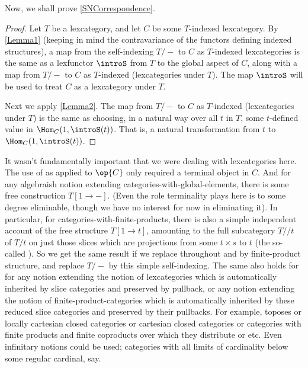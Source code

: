 Now, we shall prove \cref{SNCorrespondence}.

\begin{proof}
Let $T$ be a lexcategory, and let $C$ be some $T$-indexed lexcategory. By \cref{Lemma1} (keeping in mind the contravariance of the functors defining indexed structures), a map from the self-indexing $T/-$ to $C$ as $T$-indexed lexcategories is the same as a lexfunctor $\introS$ from $T$ to the global aspect of $C$, along with a map from $T/-$ to $C$ as $T$-indexed (lexcategories under $T$). The map $\introS$ will be used to treat $C$ as a lexcategory under $T$.

Next we apply \cref{Lemma2}. The map from $T/-$ to $C$ as $T$-indexed (lexcategories under $T$) is the same as choosing, in a natural way over all $t$ in $T$, some $t$-defined value in $\Hom_C(1, \introS(t))$. That is, a natural transformation from $t$ to $\Hom_C(1, \introS(t))$.
\end{proof}

\begin{remark}\label{IntrospGeneralDoctrine}
It wasn't fundamentally important that we were dealing with lexcategories here. The use of  as applied to $\op{C}$ only required a terminal object in $C$. And for any algebraish notion extending categories-with-global-elements, there is some free construction $T[1 \to -]$. (Even the role terminality plays here is to some degree eliminable, though we have no interest for now in eliminating it). In particular, for categories-with-finite-products, there is also a simple independent account of the free structure $T[1 \to t]$, amounting to the full subcategory $T//t$ of $T/t$ on just those slices which are projections from some $t \times s$ to $t$ (the so-called ). So we get the same result if we replace throughout  and  by finite-product structure, and replace $T/-$ by this simple self-indexing. The same also holds for for any notion extending the notion of lexcategories which is automatically inherited by slice categories and preserved by pullback, or any notion extending the notion of finite-product-categories which is automatically inherited by these reduced slice categories and preserved by their pullbacks. For example, toposes or locally cartesian closed categories or cartesian closed categories or categories with finite products and finite coproducts over which they distribute or etc. Even infinitary notions could be used; categories with all limits of cardinality below some regular cardinal, say.
\end{remark}

